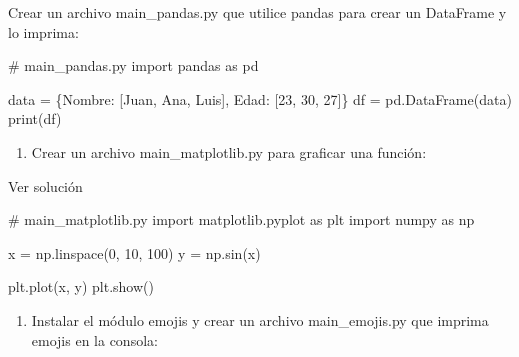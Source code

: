 \documentclass[
  a4paper,
  DIV=11,
  numbers=noendperiod,
  onepage,
  openany]{scrreprt}
\newenvironment{Shaded}{\begin{snugshade}}{\end{snugshade}}
\newcommand{\BuiltInTok}[1]{\textcolor[rgb]{0.00,0.23,0.31}{#1}}
\newcommand{\CommentTok}[1]{\textcolor[rgb]{0.37,0.37,0.37}{#1}}
\newcommand{\DecValTok}[1]{\textcolor[rgb]{0.68,0.00,0.00}{#1}}
\newcommand{\ImportTok}[1]{\textcolor[rgb]{0.00,0.46,0.62}{#1}}
\newcommand{\NormalTok}[1]{\textcolor[rgb]{0.00,0.23,0.31}{#1}}
\newcommand{\OperatorTok}[1]{\textcolor[rgb]{0.37,0.37,0.37}{#1}}
\newcommand{\StringTok}[1]{\textcolor[rgb]{0.13,0.47,0.30}{#1}}
\providecommand{\tightlist}{%
  \setlength{\itemsep}{0pt}\setlength{\parskip}{0pt}}\usepackage{longtable,booktabs,array}
\begin{document}
Crear un archivo main\_pandas.py que utilice pandas para crear un
DataFrame y lo imprima:

\begin{Shaded}
\begin{Highlighting}[]
\CommentTok{\# main\_pandas.py}
\ImportTok{import}\NormalTok{ pandas }\ImportTok{as}\NormalTok{ pd}

\NormalTok{data }\OperatorTok{=}\NormalTok{ \{}\StringTok{\textquotesingle{}Nombre\textquotesingle{}}\NormalTok{: [}\StringTok{\textquotesingle{}Juan\textquotesingle{}}\NormalTok{, }\StringTok{\textquotesingle{}Ana\textquotesingle{}}\NormalTok{, }\StringTok{\textquotesingle{}Luis\textquotesingle{}}\NormalTok{], }\StringTok{\textquotesingle{}Edad\textquotesingle{}}\NormalTok{: [}\DecValTok{23}\NormalTok{, }\DecValTok{30}\NormalTok{, }\DecValTok{27}\NormalTok{]\}}
\NormalTok{df }\OperatorTok{=}\NormalTok{ pd.DataFrame(data)}
\BuiltInTok{print}\NormalTok{(df)}
\end{Highlighting}
\end{Shaded}

\begin{enumerate}
\def\labelenumi{\arabic{enumi}.}
\setcounter{enumi}{2}
\tightlist
\item
  Crear un archivo main\_matplotlib.py para graficar una función:
\end{enumerate}

Ver solución

\begin{Shaded}
\begin{Highlighting}[]
\CommentTok{\# main\_matplotlib.py}
\ImportTok{import}\NormalTok{ matplotlib.pyplot }\ImportTok{as}\NormalTok{ plt}
\ImportTok{import}\NormalTok{ numpy }\ImportTok{as}\NormalTok{ np}

\NormalTok{x }\OperatorTok{=}\NormalTok{ np.linspace(}\DecValTok{0}\NormalTok{, }\DecValTok{10}\NormalTok{, }\DecValTok{100}\NormalTok{)}
\NormalTok{y }\OperatorTok{=}\NormalTok{ np.sin(x)}

\NormalTok{plt.plot(x, y)}
\NormalTok{plt.show()}
\end{Highlighting}
\end{Shaded}

\begin{enumerate}
\def\labelenumi{\arabic{enumi}.}
\setcounter{enumi}{3}
\tightlist
\item
  Instalar el módulo emojis y crear un archivo main\_emojis.py que
  imprima emojis en la consola:
\end{enumerate}
\end{document}
